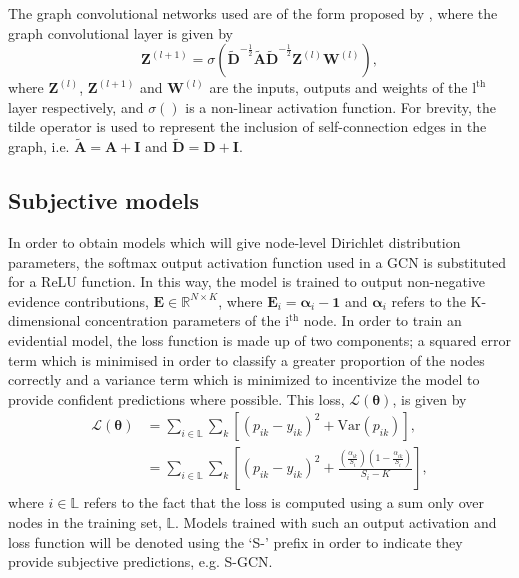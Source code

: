 \documentclass[
twocolumn,
]{ceurart}
\begin{document}
The graph convolutional networks used are of the form proposed by \cite{Kipf2017}, where the graph convolutional layer is given by
\begin{equation}
    \mathbf{Z}^{(l+1)}=\sigma\left(\tilde{\mathbf{D}}^{-\frac{1}{2}}\tilde{\mathbf{A}}\tilde{\mathbf{D}}^{-\frac{1}{2}}\mathbf{Z}^{(l)}\boldsymbol{W}^{(l)}\right),
\label{eq::gcn_layer}
\end{equation}
where $\mathbf{Z}^{(l)}$, $\mathbf{Z}^{(l+1)}$ and $\boldsymbol{W}^{(l)}$ are the inputs, outputs and weights of the $\textrm{l}^\textrm{th}$ layer respectively, and $\sigma()$ is a non-linear activation function.
For brevity, the tilde operator is used to represent the inclusion of self-connection edges in the graph, i.e. $\tilde{\mathbf{A}}=\mathbf{A}+\mathbf{I}$ and $\tilde{\mathbf{D}}=\mathbf{D}+\mathbf{I}$.

\subsection{Subjective models}
In order to obtain models which will give node-level Dirichlet distribution parameters, the softmax output activation function used in a GCN is substituted for a ReLU function.
In this way, the model is trained to output non-negative evidence contributions, $\mathbf{E}\in\mathbb{R}^{N\times K}$, where $\mathbf{E}_{i} = \boldsymbol{\alpha}_{i}-\mathbf{1}$ and $\boldsymbol{\alpha}_{i}$ refers to the K-dimensional concentration parameters of the $\text{i}^\text{th}$ node.
In order to train an evidential model, the loss function is made up of two components; a squared error term which is minimised in order to classify a greater proportion of the nodes correctly and a variance term which is minimized to incentivize the model to provide confident predictions where possible.
This loss, $\mathcal{L}(\boldsymbol{\theta})$, is given by
\begin{equation}
\begin{split}
    \mathcal{L}(\boldsymbol{\theta})&=\sum_{i\in\mathbb{L}}\sum_k \left[(p_{ik}-y_{ik})^2+\text{Var}(p_{ik})\right],\\
    &=\sum_{i\in\mathbb{L}}\sum_k \left[(p_{ik}-y_{ik})^2+\frac{\left(\frac{\alpha_{ik}}{S_i}\right)\left(1-\frac{\alpha_{ik}}{S_i}\right)}{S_i-K}\right],
\end{split}
\label{eq:core_loss}
\end{equation}
where $i\in\mathbb{L}$ refers to the fact that the loss is computed using a sum only over nodes in the training set, $\mathbb{L}$.
Models trained with such an output activation and loss function will be denoted using the `S-' prefix in order to indicate they provide subjective predictions, e.g. S-GCN.
\end{document}
